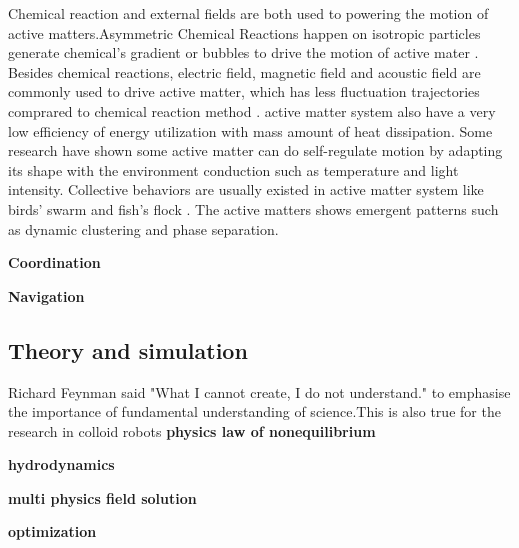 Chemical reaction and external fields are both used to powering the motion of active matters.Asymmetric Chemical Reactions happen on isotropic particles generate chemical's gradient or bubbles to drive the motion of active mater \cite{shklyaev2016harnessing,parmar2018micro}. Besides chemical reactions, electric field, magnetic field and acoustic field are commonly used  to drive active matter, which has less fluctuation trajectories comprared to chemical reaction method \cite{han2018engineering,ren2018two}. active matter system also have a very low efficiency of energy utilization with mass amount of heat dissipation.\cite{wang2013understanding} Some research have shown some active matter can do self-regulate motion by adapting its shape with the environment conduction such as temperature and light intensity.\cite{tu2017self,li2018light} Collective behaviors are usually existed in active matter system like birds' swarm and fish's flock \cite{wang2015one}. The active matters shows emergent patterns such as dynamic clustering and phase separation.\cite{ginot2018aggregation} 

\textbf{Coordination}

\textbf{Navigation}

\subsection{Theory and simulation}
Richard Feynman said "What I cannot create, I do not understand." to emphasise the importance of fundamental understanding of science.This is also true for the  research in colloid robots  
\textbf{physics law of nonequilibrium }

\textbf{hydrodynamics}

\textbf{multi physics field solution }

\textbf{optimization}

